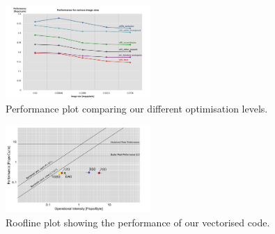 \begin{figure}\vspace{-1mm}
  \includegraphics[trim=10mm 0mm 10mm 0mm, clip, width=0.49\textwidth]{figures/performance}
  \caption{Performance plot comparing our different optimisation levels.\label{performance}}
\end{figure}
 
\begin{figure}\vspace{-1mm}
  \includegraphics[trim=10mm 0mm 10mm 0mm, clip, width=0.49\textwidth]{figures/roofline}
  \caption{Roofline plot showing the performance of our vectorised code.\label{roofline}}
\end{figure}


